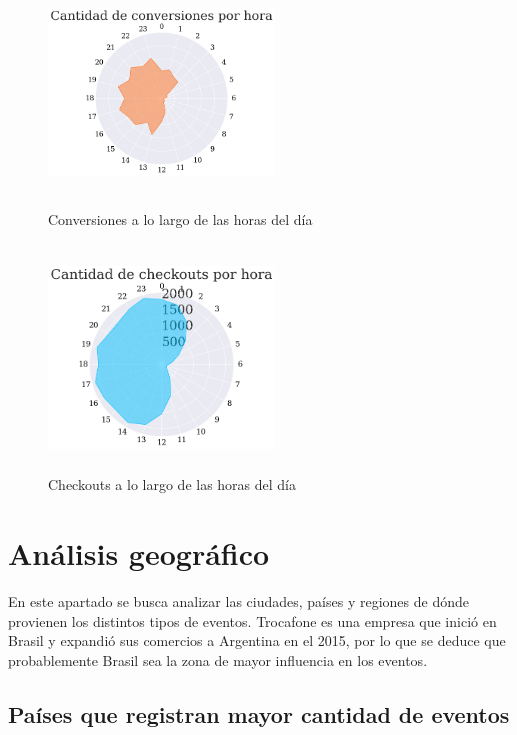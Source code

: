 \documentclass[a4paper]{article}
\begin{document}
\begin{figure}[h!]
	\includegraphics[width=6cm,height=6cm,keepaspectratio]{figures/040-hours-conversion-radarchart.png}
	\caption{Conversiones a lo largo de las horas del día}
	\label{conversionclock}
\end{figure}

\begin{figure}[h!]
	\includegraphics[width=6cm,height=6cm,keepaspectratio]{figures/041-hours-checkout-radarchart.png}
	\caption{Checkouts a lo largo de las horas del día}
	\label{checkoutclock}
\end{figure}

\section{Análisis geográfico}

En este apartado se busca analizar las ciudades, países y regiones de dónde provienen los distintos tipos de eventos. Trocafone es una empresa que inició en Brasil y expandió sus comercios a Argentina en el 2015, por lo que se deduce que probablemente Brasil sea la zona de mayor influencia en los eventos.

\subsection{Países que registran mayor cantidad de eventos} 
\end{document}
